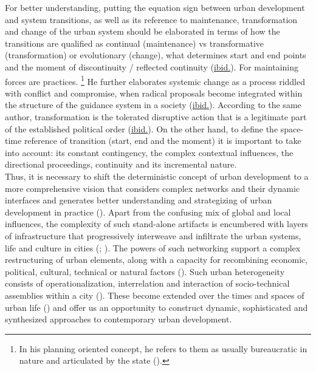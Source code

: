 \documentclass[11pt]{report}
\begin{document}
{{For better understanding, putting the equation sign between urban development and system transitions, as well as its reference to maintenance, transformation and change of the urban system should be elaborated in terms of how the transitions are qualified as continual (maintenance) vs transformative (transformation) or evolutionary (change), what determines start and end points and the moment of discontinuity / reflected continuity (\href{Nedovic}{ibid.}).
For \href{Friedmann}{\cite{friedmann_planning_1987}}
maintaining forces are practices.
\footnote{In his planning oriented concept, he refers to them as usually bureaucratic in nature and articulated by the state (\href{Friedmann}{\citealt{friedmann_planning_1987}}).}
He further elaborates systemic change as a process riddled with conflict and compromise, when radical proposals become integrated within the structure of the guidance system in a society (\href{Friedmann}{ibid.}).
According to the same author, transformation is the tolerated disruptive action that is a legitimate part of the established political order (\href{Friedmann}{ibid.}).
On the other hand, to define the space-time reference of transition (start, end and the moment) it is important to take into account: its constant contingency, the complex contextual influences, the directional proceedings, continuity and its incremental nature.
\\    

Thus, it is necessary to shift the deterministic concept of urban development to a more comprehensive vision that considers complex networks and their dynamic interfaces and generates better understanding and strategizing of urban development in practice (\href{Huang}{\citealt{huang_ict-oriented_2012}}).
Apart from the confusing mix of global and local influences, the complexity of such stand-alone artifacts is encumbered with layers of infrastructure that progressively interweave and infiltrate the urban systems, life and culture in cities (\href{Graham}{\citealt{graham_end_1998}}; \href{Portugali}{\citealt{portugali_complexity_2011}}).
The powers of such networking support a complex restructuring of urban elements, along with a capacity for recombining economic, political, cultural, technical or natural factors (\href{Murdoch}{\citealt{murdoch_spaces_1998}}).
Such urban heterogeneity consists of operationalization, interrelation and interaction of socio-technical assemblies within a city (\href{Graham}{\citealt{graham_splintering_2001}}).
These become extended over the times and spaces of urban life (\href{Mitchell}{\citealt{mitchell_city_1996}}) and offer us an opportunity to construct dynamic, sophisticated and synthesized approaches to contemporary urban development.
\\

}}
\end{document}
